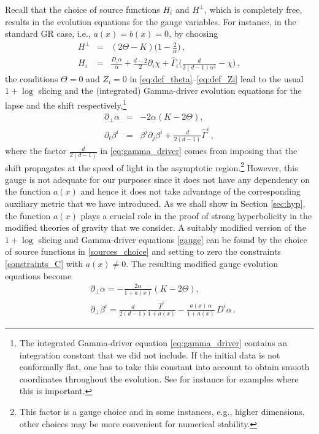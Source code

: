 \documentclass[reprint,aps,amsmath,amssymb,twoside,prd,showkeys,superscriptaddress,nofootinbib]{revtex4-2}
\begin{document}
Recall that the choice of source functions $H_i$ and $H^{\perp}$, which is completely free, results in the evolution equations for the gauge variables. For instance, in the standard GR case, i.e., $a(x)=b(x)=0$, by choosing
\begin{subequations}\label{sources_choice}
\begin{eqnarray}
H^{\perp}&=&(2\Theta-K)\big(1-\tfrac{2}{\alpha} \big)\,, \\ 
H_i &=& \tfrac{D_i\alpha}{\alpha}+\tfrac{d-2}{2}\partial_i\chi+\hat{\Gamma}_i\big(\tfrac{d}{2(d-1)\alpha^2}-\chi \big)\,,
\end{eqnarray}
\end{subequations}
the conditions $\Theta=0$ and $Z_i=0$ in \eqref{eq:def_theta}--\eqref{eq:def_Zi} lead to the usual  $1+\log$ slicing and the (integrated) Gamma-driver evolution equations for the lapse and the shift respectively,\footnote{The integrated Gamma-driver equation \eqref{eq:gamma_driver} contains an integration constant that we did not include. If the initial data is not conformally flat, one has to take this constant into account to obtain smooth coordinates throughout the evolution. See for instance \cite{Figueras:2015hkb,Figueras:2017zwa} for examples where this is important.}
\begin{subequations}\label{gauge}
\begin{eqnarray}
\partial_{\perp}\alpha  &=& - 2\alpha(K-2\Theta), \\
\partial_t\beta^i &=&\beta^j\partial_j \beta^i +\tfrac{d}{2(d-1)}\hat{\Gamma}^i\,,\label{eq:gamma_driver}
\end{eqnarray}
\end{subequations}
where the factor $\frac{d}{2(d-1)}$  in \eqref{eq:gamma_driver} comes from imposing that the shift propagates at the speed of light in the asymptotic region.\footnote{This factor is a gauge choice and in some instances, e.g., higher dimensions, other choices may be more convenient for numerical stability.} However, this gauge is not adequate for our purposes since it does not have any dependency on the function $a(x)$ and hence it does not take advantage of the corresponding auxiliary metric that we have introduced. As we shall show in Section \ref{sec:hyp}, the function $a(x)$ plays a crucial role in the proof of strong hyperbolicity in the modified theories of gravity that we consider. A suitably modified version of the $1+\log$ slicing and Gamma-driver equations \eqref{gauge} can be found by the choice of source functions in \eqref{sources_choice} and setting to zero the constraints \eqref{constraints_C} with $a(x)\neq 0$. 
The resulting modified gauge evolution equations become
\begin{subequations}\label{mgauge}
\begin{eqnarray}
&\partial_{\perp}\alpha = -\frac{2\alpha}{1+a(x)}(K-2\Theta), \\
&\partial_{\perp}\beta^i = \frac{d}{2(d-1)} \frac{\hat{\Gamma}^i}{1+a(x)}-\frac{a(x)\,\alpha}{1+a(x)}\,D^i\alpha\,.
\end{eqnarray} 
\end{subequations}
\end{document}
